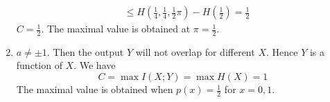 \begin{exercise}
\begin{solution}
\begin{enumerate}
{\begin{equation}
\begin{aligned}
          & \leq H(\frac{1}{4},\frac{1}{4},\frac{1}{2}\pi)-H(\frac{1}{2}) = \frac{1}{2}
          \end{aligned}
        \end{equation}
        $C = \frac{1}{2}$. The maximal value is obtained at $\pi = \frac{1}{2}$.
    }
    \item{$a \neq \pm 1$. Then the output $Y$ will not overlap for different $X$. Hence $Y$ is a function of $X$. We have
    \begin{equation}
      C=\max I(X ; Y)=\max H(X) = 1
    \end{equation}
    The maximal value is obtained when $p(x) = \frac{1}{2}$ for $x=0,1$.
    }
  \end{enumerate}
  \end{solution}
  \label{ex6-6}
\end{exercise}

